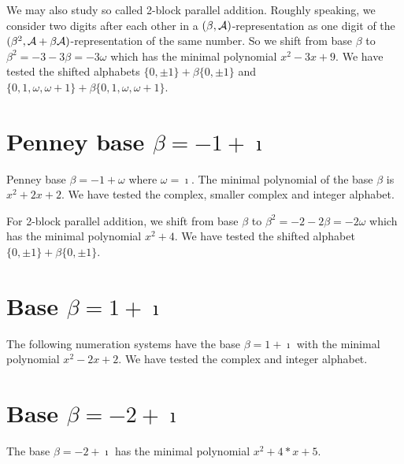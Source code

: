 



We may also study so called 2-block parallel addition. Roughly speaking, we consider two digits after each other in a $(\beta,\mathcal{A})$-representation as one digit of the $(\beta^2,\mathcal{A}+\beta\mathcal{A})$-representation of the same number. So we shift from base $\beta$ to $\beta^2=-3-3\beta=-3\omega$ which has the minimal polynomial $x^2-3x+9$. We have tested the shifted alphabets $\{0,\pm 1\}+\beta \{0,\pm 1\}$ and $\{0,1, \omega, \omega +1\}+\beta \{0,1, \omega, \omega +1\}$.
  



\section{\texorpdfstring{Penney base $\beta = -1 + \imath$}{Penney base beta = -1 + i}}
Penney base $\beta = -1 + \omega$ where $\omega=\imath$. The minimal polynomial of the base $\beta$ is $x^2 + 2x+2$. We have tested the complex, smaller complex and integer alphabet.
% 
% 
% 

For 2-block parallel addition, we shift from base $\beta$ to $\beta^2=-2-2\beta=-2\omega$ which has the minimal polynomial $x^{2} + 4$. We have tested the shifted alphabet $\{0,\pm 1\}+\beta \{0,\pm 1\}$.

% 

\section{\texorpdfstring{Base $\beta = 1 + \imath$}{Base beta = 1 + i}}
The following numeration systems have the base $\beta =1 + \imath$ with the minimal polynomial $x^2-2x+2$. We have tested the complex and integer alphabet.



 

\section{Base $\beta = -2 + \imath$}
The base  $\beta = -2 + \imath$ has the minimal polynomial $x^2+4*x +5$.

% 
